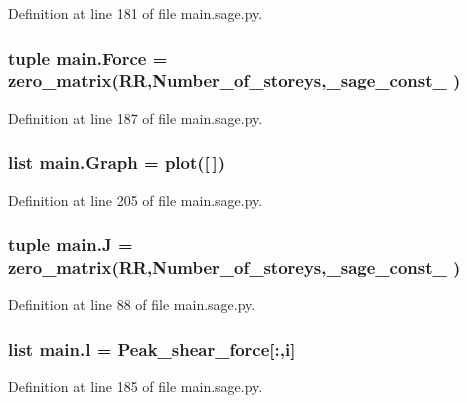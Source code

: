 Definition at line 181 of file main.\+sage.\+py.

\hypertarget{namespacemain_aa91561fad2579200e566fa01f3cbc359}{}
\subsubsection[{Force}]{\setlength{\rightskip}{0pt plus 5cm}tuple main.\+Force = zero\+\_\+matrix(R\+R,Number\+\_\+of\+\_\+storeys,\+\_\+sage\+\_\+const\+\_ )}\label{namespacemain_aa91561fad2579200e566fa01f3cbc359}


Definition at line 187 of file main.\+sage.\+py.

\hypertarget{namespacemain_ad40f6b3437e83a0385177ac65a317b97}{}
\subsubsection[{Graph}]{\setlength{\rightskip}{0pt plus 5cm}list main.\+Graph = plot(\mbox{[}$\,$\mbox{]})}\label{namespacemain_ad40f6b3437e83a0385177ac65a317b97}


Definition at line 205 of file main.\+sage.\+py.

\hypertarget{namespacemain_a00488f5887e168f7781b6fb94dd08518}{}
\subsubsection[{J}]{\setlength{\rightskip}{0pt plus 5cm}tuple main.\+J = zero\+\_\+matrix(R\+R,Number\+\_\+of\+\_\+storeys,\+\_\+sage\+\_\+const\+\_ )}\label{namespacemain_a00488f5887e168f7781b6fb94dd08518}


Definition at line 88 of file main.\+sage.\+py.

\hypertarget{namespacemain_a027916efc284622d928c1d8383917f6d}{}
\subsubsection[{l}]{\setlength{\rightskip}{0pt plus 5cm}list main.\+l = {\bf Peak\+\_\+shear\+\_\+force}\mbox{[}\+:,{\bf i}\mbox{]}}\label{namespacemain_a027916efc284622d928c1d8383917f6d}


Definition at line 185 of file main.\+sage.\+py.

\hypertarget{namespacemain_a712447a841ce148ad2d1210e57dc7894}{}
